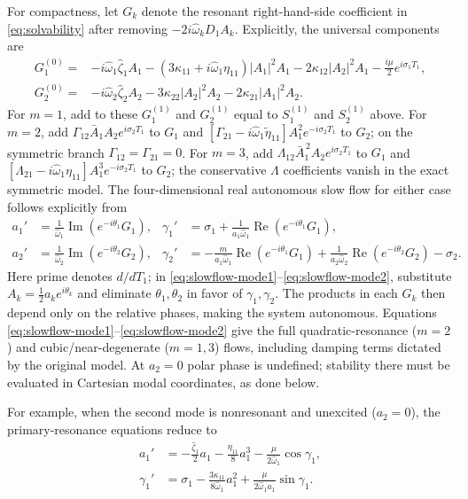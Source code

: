 \documentclass[11pt]{article}
\begin{document}
For compactness, let $G_k$ denote the resonant right-hand-side coefficient in \eqref{eq:solvability} after removing $-2i\hat\omega_kD_1A_k$. Explicitly, the universal components are
\begin{align*}
G_1^{(0)}={}&-i\hat\omega_1\hat\zeta_1A_1-(3\kappa_{11}+i\hat\omega_1\eta_{11})|A_1|^2A_1-2\kappa_{12}|A_2|^2A_1-\frac{i\mu}{2}e^{i\sigma_1T_1},\\
G_2^{(0)}={}&-i\hat\omega_2\hat\zeta_2A_2-3\kappa_{22}|A_2|^2A_2-2\kappa_{21}|A_1|^2A_2.
\end{align*}
For $m=1$, add to these $G_1^{(1)}$ and $G_2^{(1)}$ equal to $S_1^{(1)}$ and $S_2^{(1)}$ above. For $m=2$, add $\Gamma_{12}\bar A_1A_2e^{i\sigma_2T_1}$ to $G_1$ and $[\Gamma_{21}-i\hat\omega_1\widetilde\eta_{11}]A_1^2e^{-i\sigma_2T_1}$ to $G_2$; on the symmetric branch $\Gamma_{12}=\Gamma_{21}=0$. For $m=3$, add $\Lambda_{12}\bar A_1^{\,2}A_2e^{i\sigma_2T_1}$ to $G_1$ and $[\Lambda_{21}-i\hat\omega_1\eta_{11}]A_1^3e^{-i\sigma_2T_1}$ to $G_2$; the conservative $\Lambda$ coefficients vanish in the exact symmetric model. The four-dimensional real autonomous slow flow for either case follows explicitly from
\begin{align}
a_1'&=\frac{1}{\hat\omega_1}\operatorname{Im}(e^{-i\theta_1}G_1),&
\gamma_1'&=\sigma_1+\frac{1}{a_1\hat\omega_1}\operatorname{Re}(e^{-i\theta_1}G_1),\label{eq:slowflow-mode1}\\
a_2'&=\frac{1}{\hat\omega_2}\operatorname{Im}(e^{-i\theta_2}G_2),&
\gamma_2'&=-\frac{m}{a_1\hat\omega_1}\operatorname{Re}(e^{-i\theta_1}G_1)
+\frac{1}{a_2\hat\omega_2}\operatorname{Re}(e^{-i\theta_2}G_2)-\sigma_2.\label{eq:slowflow-mode2}
\end{align}
Here prime denotes $d/dT_1$; in \eqref{eq:slowflow-mode1}--\eqref{eq:slowflow-mode2}, substitute $A_k=\tfrac12a_ke^{i\theta_k}$ and eliminate $\theta_1,\theta_2$ in favor of $\gamma_1,\gamma_2$. The products in each $G_k$ then depend only on the relative phases, making the system autonomous. Equations \eqref{eq:slowflow-mode1}--\eqref{eq:slowflow-mode2} give the full quadratic-resonance ($m=2$) and cubic/near-degenerate ($m=1,3$) flows, including damping terms dictated by the original model. At $a_2=0$ polar phase is undefined; stability there must be evaluated in Cartesian modal coordinates, as done below.

For example, when the second mode is nonresonant and unexcited ($a_2=0$), the primary-resonance equations reduce to
\begin{align*}
a_1'&=-\frac{\hat\zeta_1}{2}a_1-\frac{\eta_{11}}{8}a_1^3-\frac{\mu}{2\hat\omega_1}\cos\gamma_1,\\
\gamma_1'&=\sigma_1-\frac{3\kappa_{11}}{8\hat\omega_1}a_1^2+\frac{\mu}{2\hat\omega_1a_1}\sin\gamma_1.
\end{align*}
\end{document}
